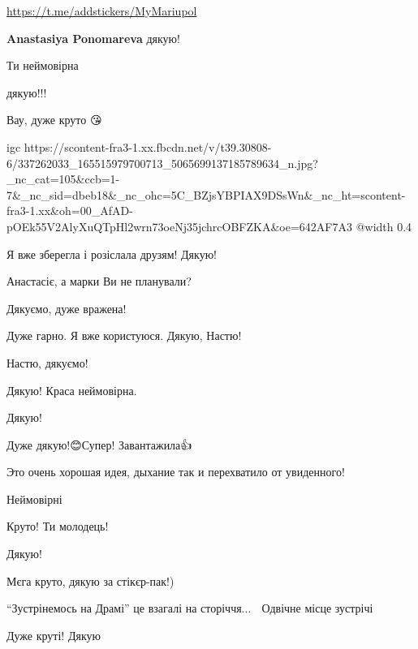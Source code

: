 
\url{https://t.me/addstickers/MyMariupol}

\begin{itemize} %
\textbf{Anastasiya Ponomareva} дякую!
\end{itemize} %


Ти неймовірна 🙏💛💙


дякую!!!


Вау, дуже круто 😘

\ifcmt
  igc https://scontent-fra3-1.xx.fbcdn.net/v/t39.30808-6/337262033_165515979700713_5065699137185789634_n.jpg?_nc_cat=105&ccb=1-7&_nc_sid=dbeb18&_nc_ohc=5C_BZjsYBPIAX9DSsWn&_nc_ht=scontent-fra3-1.xx&oh=00_AfAD-pOEk55V2AlyXuQTpHl2wrn73oeNj35jchrcOBFZKA&oe=642AF7A3
	@width 0.4
\fi


Я вже зберегла і розіслала друзям! Дякую!


Анастасіє, а марки Ви не планували?


Дякуємо, дуже вражена!


Дуже гарно. Я вже користуюся. Дякую, Настю!


Настю, дякуємо!


Дякую! Краса неймовірна.


Дякую!


Дуже дякую!😊Супер! Завантажила👍


Это очень хорошая идея, дыхание так и перехватило от увиденного!


Неймовірні🤩


Круто! Ти молодець!


Дякую!


Мєга круто, дякую за стікєр-пак!)


\enquote{Зустрінемось на Драмі} це взагалі на сторіччя... 🥹 Одвічне місце зустрічі


Дуже круті! Дякую
